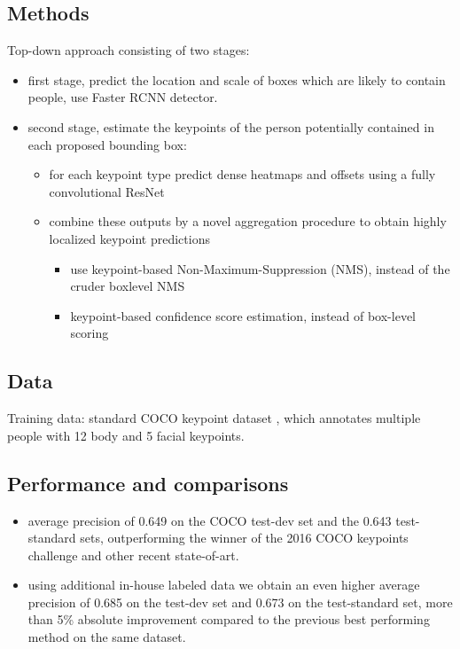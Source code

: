\subsection{Methods}
 Top-down approach consisting of two stages:
 \begin{itemize}
    \item first stage, predict the location and scale of boxes which are likely to contain people, use Faster RCNN detector.
    \item second stage, estimate the keypoints of the person potentially contained in each proposed bounding box:
        \begin{itemize}
            \item for each keypoint type predict dense heatmaps and offsets using a fully convolutional ResNet
            \item combine these outputs by a novel aggregation procedure to obtain highly localized keypoint predictions

             \begin{itemize}
             \item use keypoint-based Non-Maximum-Suppression (NMS), instead of the cruder boxlevel NMS
             \item keypoint-based confidence score estimation, instead of box-level scoring
    
             \end{itemize}
        \end{itemize}
 \end{itemize}


\subsection{Data}

Training data: standard COCO keypoint dataset \cite{coco2016}, which annotates multiple people with 12 body and 5 facial keypoints.


\subsection{Performance and comparisons}
\begin{itemize}
    \item average precision of 0.649 on the COCO test-dev set and the 0.643 test-standard sets, outperforming the winner of the 2016 COCO keypoints challenge and other recent state-of-art.
    \item using additional in-house labeled data we obtain an even higher average precision of 0.685 on the test-dev set and 0.673 on the test-standard set, more than 5\% absolute improvement compared to the previous best performing method on the same dataset.

\end{itemize}



